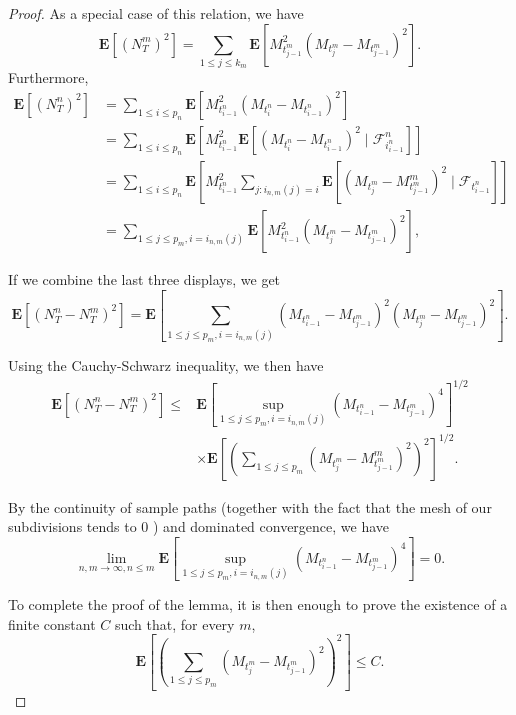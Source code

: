 \documentclass[twoside, 12pt]{book}
\numberwithin{equation}{chapter}
\def\bE{{\mathbf E}}
\def\leq{\leqslant}
\begin{document}
\begin{proof}
		As a special case of this relation, we have
		$$
		\bE\left[\left(N_T^m\right)^2\right]=\sum_{1 \leq j \leq k_m} \bE\left[M_{t_{j-1}^m}^2\left(M_{t_j^m}-M_{t_{j-1}^m}\right)^2\right] .
		$$
		Furthermore,
		\begin{equation*}
			\begin{aligned}
				\bE\left[\left(N_T^n\right)^2\right] & =\sum_{1 \leq i \leq p_n} \bE\left[M_{t_{i-1}^n}^2\left(M_{t_i^n}-M_{t_{i-1}^n}\right)^2\right] \\
				& =\sum_{1 \leq i \leq p_n} \bE\left[M_{t_{i-1}^n}^2 \bE\left[\left(M_{t_i^n}-M_{t_{i-1}^n}\right)^2 \mid \mathscr{F}_{i_{i-1}^n}^n\right]\right] \\
				& =\sum_{1 \leq i \leq p_n} \bE\left[M_{t_{i-1}^n}^2 \sum_{j: i_{n, m}(j)=i} \bE\left[\left(M_{t_j^m}-M_{t_{j-1}^m}^m\right)^2 \mid \mathscr{F}_{t_{i-1}^n}\right]\right] \\
				& =\sum_{1 \leq j \leq p_m, i=i_{n, m}(j)} \bE\left[M_{t_{i-1}^n}^2\left(M_{t_j^m}-M_{t_{j-1}^m}\right)^2\right],
			\end{aligned}
		\end{equation*}
		
		If we combine the last three displays, we get
		$$
		\bE\left[\left(N_T^n-N_T^m\right)^2\right]=\bE\left[\sum_{1 \leq j \leq p_m, i=i_{n, m}(j)}\left(M_{t_{i-1}^n}-M_{t_{j-1}^m}\right)^2\left(M_{t_j^m}-M_{t_{j-1}^m}\right)^2\right] .
		$$
		
		Using the Cauchy-Schwarz inequality, we then have
		$$
		\begin{aligned}
			\bE\left[\left(N_T^n-N_T^m\right)^2\right] \leq & \bE\left[\sup _{1 \leq j \leq p_m, i=i_{n, m}(j)}\left(M_{t_{i-1}^n}-M_{t_{j-1}^m}\right)^4\right]^{1 / 2} \\
			& \times \bE\left[\left(\sum_{1 \leq j \leq p_m}\left(M_{t_j^m}-M_{t_{j-1}^m}^m\right)^2\right)^2\right]^{1 / 2} .
		\end{aligned}
		$$
		
		By the continuity of sample paths (together with the fact that the mesh of our subdivisions tends to 0 ) and dominated convergence, we have
		$$
		\lim _{n, m \rightarrow \infty, n \leq m} \bE\left[\sup _{1 \leq j \leq p_m, i=i_{n, m}(j)}\left(M_{t_{i-1}^n}-M_{t_{j-1}^m}\right)^4\right]=0 .
		$$
		
		To complete the proof of the lemma, it is then enough to prove the existence of a finite constant $C$ such that, for every $m$,
		$$
		\bE\left[\left(\sum_{1 \leq j \leq p_m}\left(M_{t_j^m}-M_{t_{j-1}^m}\right)^2\right)^2\right] \leq C .
		$$
		

\end{proof}
\end{document}
